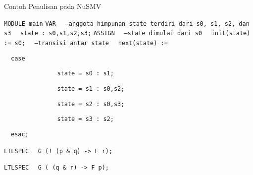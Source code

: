 \begin{algorithm} [H]
	\begin{algorithmic}[1]
		\caption{Contoh Penulisan pada NuSMV}
		\State \texttt{MODULE main}
		\State \texttt{VAR}	
		\State \texttt{$\hspace{1em}$--anggota himpunan state terdiri dari s0, s1, s2, dan s3}
		\State \texttt{$\hspace{1em}$state : {s0,s1,s2,s3};}	
		\State \texttt{ASSIGN}
		\State \texttt{$\hspace{1em}$--state dimulai dari s0}
		\State \texttt{$\hspace{1em}$init(state) := s0;}
		\State \texttt{$\hspace{1em}$--transisi antar state}
		\State \texttt{$\hspace{1em}$next(state) := }
		
		\State \texttt{$\hspace{1em}$case}
		
		\State \texttt{~~~~~~~~~~~~~~~state = s0 : {s1};}
		
		\State \texttt{~~~~~~~~~~~~~~~state = s1 : {s0,s2};}
		
		\State \texttt{~~~~~~~~~~~~~~~state = s2 : {s0,s3};}
		
		\State \texttt{~~~~~~~~~~~~~~~state = s3 : {s2};}
		
		\State \texttt{$\hspace{1em}$esac;}
		
		\State \texttt{LTLSPEC} \texttt{$\hspace{1em}$G (! (p \& q) -> F r);}	
		
		\State \texttt{LTLSPEC} \texttt{$\hspace{1em}$G ( (q \& r) -> F p);}
	\end{algorithmic}
\end{algorithm}